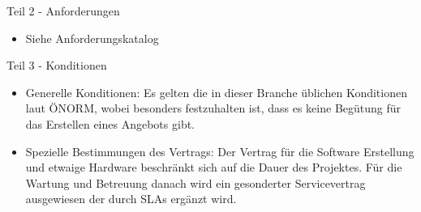 Teil 2 - Anforderungen

\begin{itemize}

	\item Siehe Anforderungskatalog

\end{itemize}

Teil 3 - Konditionen

\begin{itemize}

\item Generelle Konditionen: Es gelten die in dieser Branche \"ublichen Konditionen laut \"ONORM, wobei besonders festzuhalten ist, dass es keine Beg\"utung f\"ur das Erstellen eines Angebots gibt.

\item Spezielle Bestimmungen des Vertrags: Der Vertrag f\"ur die Software Erstellung und etwaige Hardware beschr\"ankt sich auf die Dauer des Projektes. F\"ur die Wartung und Betreuung danach wird ein gesonderter Servicevertrag ausgewiesen der durch SLAs erg\"anzt wird.

\end{itemize}
